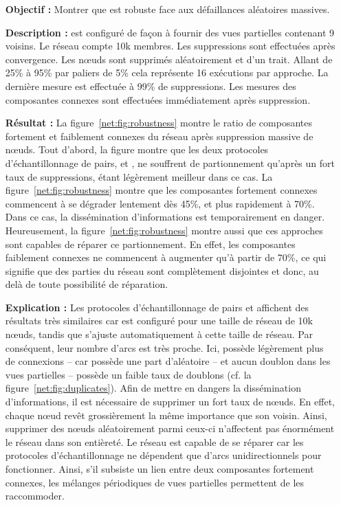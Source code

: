 \begin{itemize}
\item [\textbf{Objectif :}] Montrer que \SPRAY est robuste face aux défaillances
  aléatoires massives.
\item [\textbf{Description :}] \CYCLON est configuré de façon à fournir des vues
  partielles contenant 9 voisins. Le réseau compte 10k membres. Les suppressions
  sont effectuées après convergence. Les nœuds sont supprimés aléatoirement et
  d'un trait. Allant de 25\% à 95\% par paliers de 5\% cela représente 16
  exécutions par approche. La dernière mesure est effectuée à 99\% de
  suppressions. Les mesures des composantes connexes sont effectuées
  immédiatement après suppression.
\item [\textbf{Résultat :}] La figure~\ref{net:fig:robustness} montre le ratio
  de composantes fortement et faiblement connexes du réseau après suppression
  massive de nœuds. Tout d'abord, la figure montre que les deux protocoles
  d'échantillonnage de pairs, \SPRAY et \CYCLON, ne souffrent de partionnement
  qu'après un fort taux de suppressions, \CYCLON étant légèrement meilleur dans
  ce cas. La figure~\ref{net:fig:robustness} montre que les composantes
  fortement connexes commencent à se dégrader lentement dès 45\%, et plus
  rapidement à 70\%. Dans ce cas, la dissémination d'informations est
  temporairement en danger. Heureusement, la figure~\ref{net:fig:robustness}
  montre aussi que ces approches sont capables de réparer ce partionnement. En
  effet, les composantes faiblement connexes ne commencent à augmenter qu'à
  partir de 70\%, ce qui signifie que des parties du réseau sont complètement
  disjointes et donc, au delà de toute possibilité de réparation.
\item [\textbf{Explication :}] Les protocoles d'échantillonnage de pairs \CYCLON
  et \SPRAY affichent des résultats très similaires car \CYCLON est configuré
  pour une taille de réseau de 10k nœuds, tandis que \SPRAY s'ajuste
  automatiquement à cette taille de réseau. Par conséquent, leur nombre d'arcs
  est très proche. Ici, \CYCLON possède légèrement plus de connexions -- car
  \SPRAY possède une part d'aléatoire -- et aucun doublon dans les vues
  partielles -- \SPRAY possède un faible taux de doublons (cf. la
  figure~\ref{net:fig:duplicates}). Afin de mettre en dangers la dissémination
  d'informations, il est nécessaire de supprimer un fort taux de nœuds. En
  effet, chaque nœud revêt grossièrement la même importance que son
  voisin. Ainsi, supprimer des nœuds aléatoirement parmi ceux-ci n'affectent pas
  énormément le réseau dans son entièreté. Le réseau est capable de se réparer
  car les protocoles d'échantillonnage ne dépendent que d'arcs unidirectionnels
  pour fonctionner. Ainsi, s'il subsiste un lien entre deux composantes
  fortement connexes, les mélanges périodiques de vues partielles permettent de
  les raccommoder.
\end{itemize}

